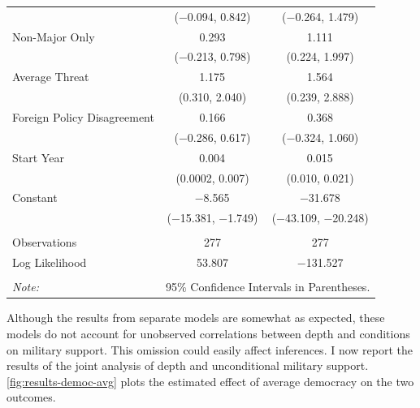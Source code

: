 \documentclass[12pt]{article}
\begin{document}
\begin{table}[!htbp]
\begin{tabular}{@{\extracolsep{5pt}}lcc}
  & ($-$0.094, 0.842) & ($-$0.264, 1.479) \\ 
  Non-Major Only & 0.293 & 1.111$^{}$ \\ 
  & ($-$0.213, 0.798) & (0.224, 1.997) \\ 
  Average Threat & 1.175$^{}$ & 1.564$^{}$ \\ 
  & (0.310, 2.040) & (0.239, 2.888) \\ 
  Foreign Policy Disagreement & 0.166 & 0.368 \\ 
  & ($-$0.286, 0.617) & ($-$0.324, 1.060) \\ 
  Start Year & 0.004$^{}$ & 0.015$^{}$ \\ 
  & (0.0002, 0.007) & (0.010, 0.021) \\ 
  Constant & $-$8.565$^{}$ & $-$31.678$^{}$ \\ 
  & ($-$15.381, $-$1.749) & ($-$43.109, $-$20.248) \\ 
 \hline \\[-1.8ex] 
Observations & 277 & 277 \\ 
Log Likelihood & 53.807 & $-$131.527 \\ 
\hline 
\hline \\[-1.8ex] 
\textit{Note:}  & \multicolumn{2}{r}{95\% Confidence Intervals in Parentheses.} \\ 
\end{tabular} 
\end{table} 

Although the results from separate models are somewhat as expected, these models do not account for unobserved correlations between depth and conditions on military support. 
This omission could easily affect inferences. 
I now report the results of the joint analysis of depth and unconditional military support. 
\autoref{fig:results-democ-avg} plots the estimated effect of average democracy on the two outcomes. 
\end{document}
